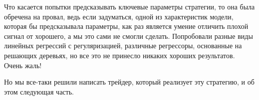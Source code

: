 Что касается попытки предсказывать ключевые параметры стратегии, то она была обречена на провал, ведь если задуматься, одной из характеристик модели, которая бы предсказывала параметры, как раз является умение отличить плохой сигнал от хорошего, а мы это сами не смогли сделать. Попробовали разные виды линейных регрессий с регуляризацией, различные регрессоры, основанные на решающих деревьях, но все это не принесло никаких хороших результатов. Очень жаль! 

Но мы все-таки решили написать трейдер, который реализует эту стратегию, и об этом следующая часть.